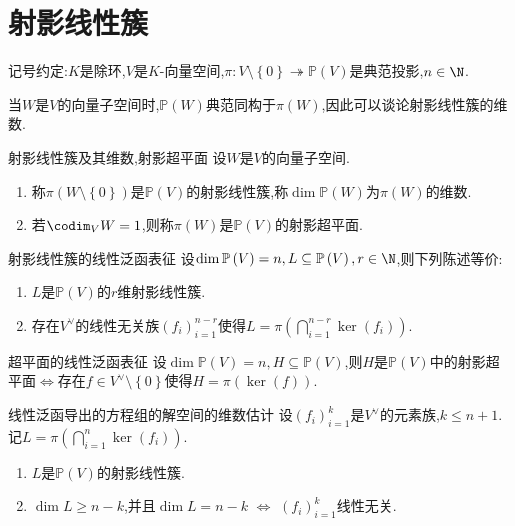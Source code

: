 \section{射影线性簇}

记号约定:$K$是除环,$V$是$K$-向量空间,$\pi:V\setminus\left\{0\right\}\twoheadrightarrow\mathbb{P}\left(V\right)$是典范投影,$n\in\N$.

\begin{remark}{}{}
	当$W$是$V$的向量子空间时,$\mathbb{P}\left(W\right)$典范同构于$\pi\left(W\right)$,因此可以谈论射影线性簇的维数.
\end{remark}

\begin{definition}{射影线性簇及其维数,射影超平面}{}
	设$W$是$V$的向量子空间.
	\begin{enumerate}
		\item 称$\pi\left(W\setminus\left\{0\right\}\right)$是$\mathbb{P}\left(V\right)$的射影线性簇,称$\dim\mathbb{P}\left(W\right)$为$\pi\left(W\right)$的维数.
		\item 若$\codim_{V}W=1$,则称$\pi\left(W\right)$是$\mathbb{P}\left(V\right)$的射影超平面.
	\end{enumerate}
\end{definition}

\begin{proposition}{射影线性簇的线性泛函表征}{}
	设$\dim\mathbb{P}\left(V\right)=n,L\subseteq\mathbb{P}\left(V\right),r\in\N$,则下列陈述等价:
	\begin{enumerate}
		\item $L$是$\mathbb{P}\left(V\right)$的$r$维射影线性簇.
		\item 存在$V^{\vee}$的线性无关族$\left(f_{i}\right)_{i=1}^{n-r}$使得$L=\pi\left(\bigcap\limits_{i=1}^{n-r}\ker\left(f_{i}\right)\right)$.
	\end{enumerate}
\end{proposition}

\begin{corollary}{超平面的线性泛函表征}{}
	设$\dim\mathbb{P}\left(V\right)=n,H\subseteq\mathbb{P}\left(V\right)$,则$H$是$\mathbb{P}\left(V\right)$中的射影超平面$\iff$存在$f\in V^{\vee}\setminus\left\{0\right\}$使得$H=\pi\left(\ker\left(f\right)\right)$.
\end{corollary}

\begin{proposition}{线性泛函导出的方程组的解空间的维数估计}{}
	设$\left(f_{i}\right)_{i=1}^{k}$是$V^{\vee}$的元素族,$k\leq n+1$.记$L=\pi\left(\bigcap\limits_{i=1}^{n}\ker\left(f_{i}\right)\right)$.
	\begin{enumerate}
		\item $L$是$\mathbb{P}\left(V\right)$的射影线性簇.
		\item $\dim L\geq n-k$,并且$\dim L=n-k$ $\iff$ $\left(f_{i}\right)_{i=1}^{k}$线性无关.
	\end{enumerate}
\end{proposition}

